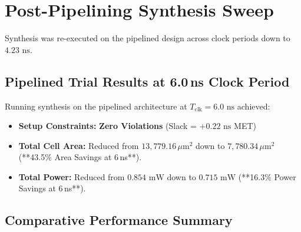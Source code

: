 \documentclass[12pt,a4paper]{article}
\begin{document}
\section{Post-Pipelining Synthesis Sweep}

Synthesis was re-executed on the pipelined design across clock periods down to $4.23\text{ ns}$.

\subsection{Pipelined Trial Results at 6.0\,ns Clock Period}
Running synthesis on the pipelined architecture at $T_{\text{clk}} = 6.0\text{ ns}$ achieved:
\begin{itemize}
  \item \textbf{Setup Constraints:} \textbf{Zero Violations} (Slack = $+0.22\text{ ns}$ MET)
  \item \textbf{Total Cell Area:} Reduced from $13,779.16\,\mu\text{m}^2$ down to \textbf{$7,780.34\,\mu\text{m}^2$} (**43.5\% Area Savings at 6\,ns**).
  \item \textbf{Total Power:} Reduced from $0.854\text{ mW}$ down to \textbf{$0.715\text{ mW}$} (**16.3\% Power Savings at 6\,ns**).
\end{itemize}

\subsection{Comparative Performance Summary}

\begin{table}[H]
\centering
{}
\caption{Synthesis Performance \& Trade-off Comparison Summary}
\end{table}
\end{document}
